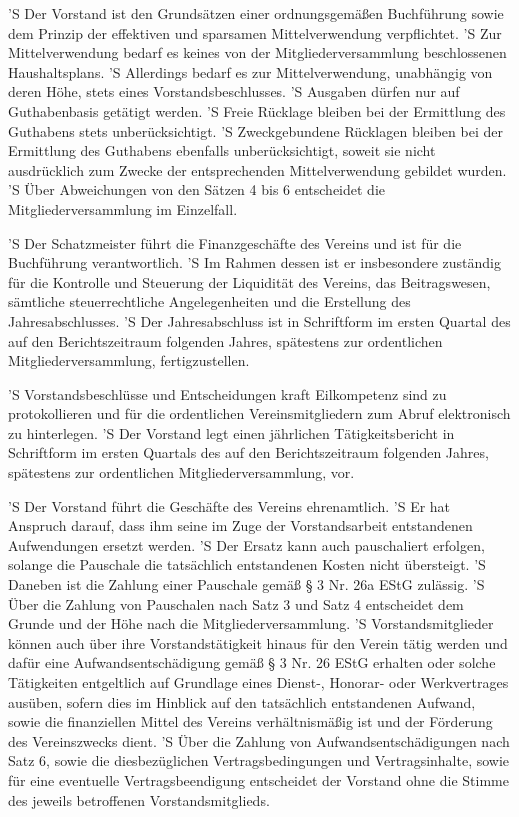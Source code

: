 \documentclass[a4paper,10pt]{scrreprt}
\begin{document}
\begin{contract}
'S Der Vorstand ist den Grundsätzen einer ordnungsgemäßen Buchführung sowie dem
Prinzip der effektiven und sparsamen Mittelverwendung verpflichtet.
'S Zur Mittelverwendung bedarf es keines von der Mitgliederversammlung
beschlossenen Haushaltsplans.
'S Allerdings bedarf es zur Mittelverwendung, unabhängig von deren Höhe, stets
eines Vorstandsbeschlusses.
'S Ausgaben dürfen nur auf Guthabenbasis getätigt werden.
'S Freie Rücklage bleiben bei der Ermittlung des Guthabens stets
unberücksichtigt.
'S Zweckgebundene Rücklagen bleiben bei der Ermittlung des Guthabens ebenfalls
unberücksichtigt, soweit sie nicht ausdrücklich zum Zwecke der entsprechenden
Mittelverwendung gebildet wurden.
'S Über Abweichungen von den Sätzen 4 bis 6 entscheidet die
Mitgliederversammlung im Einzelfall.

'S Der Schatzmeister führt die Finanzgeschäfte des Vereins und ist für die
Buchführung verantwortlich.
'S Im Rahmen dessen ist er insbesondere zuständig für die Kontrolle und
Steuerung der Liquidität des Vereins, das Beitragswesen, sämtliche
steuerrechtliche Angelegenheiten und die Erstellung des Jahresabschlusses.
'S Der Jahresabschluss ist in Schriftform im ersten Quartal des auf den
Berichtszeitraum folgenden Jahres, spätestens zur ordentlichen
Mitgliederversammlung, fertigzustellen.

'S Vorstandsbeschlüsse und Entscheidungen kraft Eilkompetenz sind zu
protokollieren und für die ordentlichen Vereinsmitgliedern zum Abruf
elektronisch zu hinterlegen.
'S Der Vorstand legt einen jährlichen Tätigkeitsbericht in Schriftform im
ersten Quartals des auf den Berichtszeitraum folgenden Jahres, spätestens zur
ordentlichen Mitgliederversammlung, vor.

'S Der Vorstand führt die Geschäfte des Vereins ehrenamtlich.
'S Er hat Anspruch darauf, dass ihm seine im Zuge der Vorstandsarbeit
entstandenen Aufwendungen ersetzt werden.
'S Der Ersatz kann auch pauschaliert erfolgen, solange die Pauschale die
tatsächlich entstandenen Kosten nicht übersteigt.
'S Daneben ist die Zahlung einer Pauschale gemäß § 3 Nr. 26a EStG zulässig.
'S Über die Zahlung von Pauschalen nach Satz 3 und Satz 4 entscheidet dem
Grunde und der Höhe nach die Mitgliederversammlung.
'S Vorstandsmitglieder können auch über ihre Vorstandstätigkeit hinaus für den
Verein tätig werden und dafür eine Aufwandsentschädigung gemäß § 3 Nr. 26 EStG
erhalten oder solche Tätigkeiten entgeltlich auf Grundlage eines Dienst-,
Honorar- oder Werkvertrages ausüben, sofern dies im Hinblick auf den tatsächlich
entstandenen Aufwand, sowie die finanziellen Mittel des Vereins verhältnismäßig
ist und der Förderung des Vereinszwecks dient.
'S Über die Zahlung von Aufwandsentschädigungen nach Satz 6, sowie die
diesbezüglichen Vertragsbedingungen und Vertragsinhalte, sowie für eine
eventuelle Vertragsbeendigung entscheidet der Vorstand ohne die Stimme des
jeweils betroffenen Vorstandsmitglieds.


\end{contract}
\end{document}
